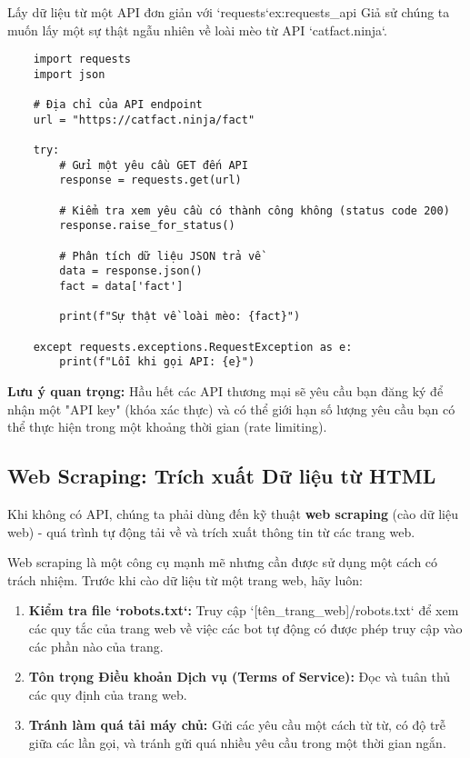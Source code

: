 \begin{example}{Lấy dữ liệu từ một API đơn giản với `requests`}{ex:requests_api}
    Giả sử chúng ta muốn lấy một sự thật ngẫu nhiên về loài mèo từ API `catfact.ninja`.

    \begin{verbatim}
    import requests
    import json

    # Địa chỉ của API endpoint
    url = "https://catfact.ninja/fact"

    try:
        # Gửi một yêu cầu GET đến API
        response = requests.get(url)
        
        # Kiểm tra xem yêu cầu có thành công không (status code 200)
        response.raise_for_status() 
        
        # Phân tích dữ liệu JSON trả về
        data = response.json()
        fact = data['fact']
        
        print(f"Sự thật về loài mèo: {fact}")
        
    except requests.exceptions.RequestException as e:
        print(f"Lỗi khi gọi API: {e}")

    \end{verbatim}
    \textbf{Lưu ý quan trọng:} Hầu hết các API thương mại sẽ yêu cầu bạn đăng ký để nhận một "API key" (khóa xác thực) và có thể giới hạn số lượng yêu cầu bạn có thể thực hiện trong một khoảng thời gian (rate limiting).
\end{example}

\subsection{Web Scraping: Trích xuất Dữ liệu từ HTML}
\label{ssec:web_scraping}
Khi không có API, chúng ta phải dùng đến kỹ thuật \textbf{web scraping} (cào dữ liệu web) - quá trình tự động tải về và trích xuất thông tin từ các trang web.

\begin{tcolorbox}[
    title=Cảnh báo về Web Scraping,
    colback=red!5!white, colframe=red!75!black, fonttitle=\bfseries
]
Web scraping là một công cụ mạnh mẽ nhưng cần được sử dụng một cách có trách nhiệm. Trước khi cào dữ liệu từ một trang web, hãy luôn:
\begin{enumerate}
    \item \textbf{Kiểm tra file `robots.txt`:} Truy cập `[tên\_trang\_web]/robots.txt` để xem các quy tắc của trang web về việc các bot tự động có được phép truy cập vào các phần nào của trang.
    \item \textbf{Tôn trọng Điều khoản Dịch vụ (Terms of Service):} Đọc và tuân thủ các quy định của trang web.
    \item \textbf{Tránh làm quá tải máy chủ:} Gửi các yêu cầu một cách từ từ, có độ trễ giữa các lần gọi, và tránh gửi quá nhiều yêu cầu trong một thời gian ngắn.
\end{enumerate}
\end{tcolorbox}


